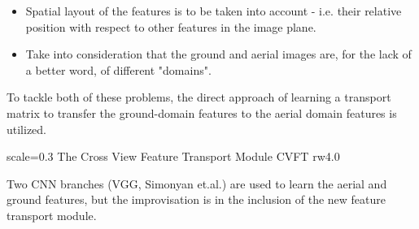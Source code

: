 \begin{itemize}
	\item Spatial layout of the features is to be taken into account - i.e. their relative position with respect to other features in the image plane. 
	
	\item Take into consideration that the ground and aerial images are, for the lack of a better word, of different "domains". 
\end{itemize}

To tackle both of these problems, the direct approach of learning a transport matrix to transfer the ground-domain features to the aerial domain features is utilized. 

{scale=0.3}%
{The Cross View Feature Transport Module}%
{CVFT}%
{rw4.0} %

Two CNN branches (VGG, Simonyan et.al.) are used to learn the aerial and ground features, but the improvisation is in the inclusion of the new feature transport module. 





